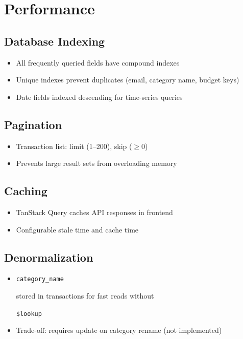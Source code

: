 \documentclass[11pt,a4paper]{article}
\newcommand{\code}[1]{\colorbox{codebg}{\strut\texttt{\small #1}}}
\begin{document}
\section{Performance}

\subsection{Database Indexing}
\begin{itemize}[leftmargin=*,itemsep=1pt]
  \item All frequently queried fields have compound indexes
  \item Unique indexes prevent duplicates (email, category name, budget keys)
  \item Date fields indexed descending for time-series queries
\end{itemize}

\subsection{Pagination}
\begin{itemize}[leftmargin=*,itemsep=1pt]
  \item Transaction list: limit (1--200), skip ($\geq 0$)
  \item Prevents large result sets from overloading memory
\end{itemize}

\subsection{Caching}
\begin{itemize}[leftmargin=*,itemsep=1pt]
  \item TanStack Query caches API responses in frontend
  \item Configurable stale time and cache time
\end{itemize}

\subsection{Denormalization}
\begin{itemize}[leftmargin=*,itemsep=1pt]
  \item \code{category\_name} stored in transactions for fast reads without \code{\$lookup}
  \item Trade-off: requires update on category rename (not implemented)
\end{itemize}
\end{document}
